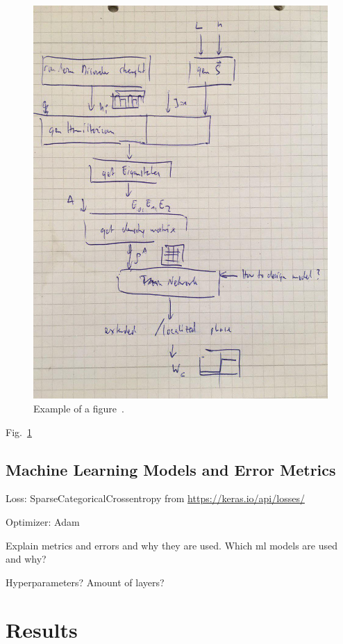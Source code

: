 \documentclass[reprint,amsmath,amssymb,aps,prb]{revtex4-2}
\begin{document}
\begin{figure}[h!]
	\includegraphics[width=0.99\linewidth]{figures/flowchart.jpg}
	\caption{Example of a figure~\cite{Orus2013}.}
	\label{fig:example}
\end{figure}

Fig.~\ref{fig:example}

\subsection{Machine Learning Models and Error Metrics}

Loss: SparseCategoricalCrossentropy from \url{https://keras.io/api/losses/}

Optimizer: Adam

Explain metrics and errors and why they are used. Which ml models are used and why?

Hyperparameters? Amount of layers?

\section{Results}%
\end{document}
